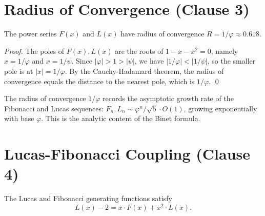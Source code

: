 \section{Radius of Convergence (Clause 3)}
\label{sec:05-radius}

\begin{theorem}
\label{thm:05-radius}
The power series $F(x)$ and $L(x)$ have radius of convergence
$R = 1/\varphi \approx 0.618$.
\end{theorem}

\begin{proof}
The poles of $F(x), L(x)$ are the roots of $1 - x - x^2 = 0$, namely
$x = 1/\varphi$ and $x = 1/\psi$. Since $|\varphi| > 1 > |\psi|$, we
have $|1/\varphi| < |1/\psi|$, so the smaller pole is at
$|x| = 1/\varphi$. By the Cauchy-Hadamard theorem, the radius of
convergence equals the distance to the nearest pole, which is
$1/\varphi$. \qed
\end{proof}

\begin{remark}
The radius of convergence $1/\varphi$ records the asymptotic growth
rate of the Fibonacci and Lucas sequences: $F_n, L_n \sim \varphi^n /
\sqrt{5} \cdot O(1)$, growing exponentially with base $\varphi$. This
is the analytic content of the Binet formula.
\end{remark}

\section{Lucas-Fibonacci Coupling (Clause 4)}
\label{sec:05-coupling}

\begin{theorem}
\label{thm:05-coupling}
The Lucas and Fibonacci generating functions satisfy
\[
  L(x) - 2 = x \cdot F(x) + x^2 \cdot L(x).
\]
\end{theorem}

